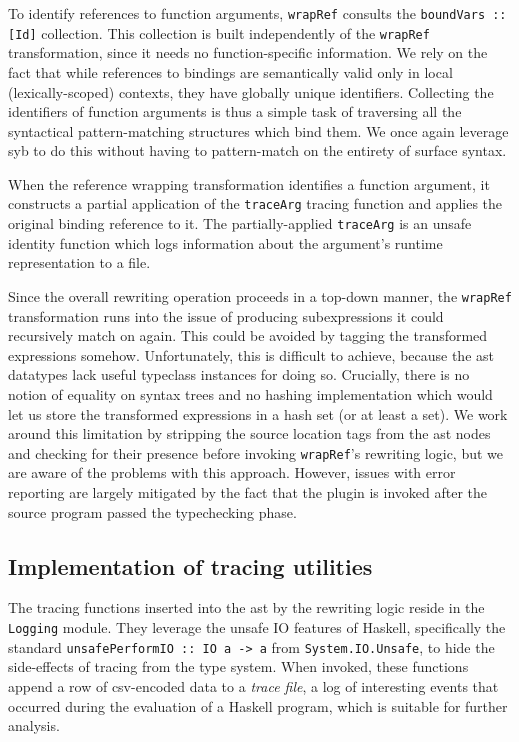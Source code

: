 \documentclass[thesis=B,english]{FITthesis}[2019/12/23]
\newcommand{\hsIdent}[1]{\texttt{#1}}
\newcommand{\hsModule}[1]{\texttt{#1}}
\newcommand{\hsCode}[1]{\texttt{#1}}
\begin{document}
\begin{description}
		To identify references to function arguments, \hsIdent{wrapRef}
		consults the \hsCode{boundVars :: [Id]} collection. This collection is
		built independently of the \hsIdent{wrapRef} transformation, since it
		needs no function-specific information. We rely on the fact that while
		references to bindings are semantically valid only in local
		(lexically-scoped) contexts, they have globally unique identifiers.
		Collecting the identifiers of function arguments is thus a simple task
		of traversing all the syntactical pattern-matching structures which
		bind them. We once again leverage \acrshort{syb} to do this without
		having to pattern-match on the entirety of surface syntax.

		When the reference wrapping transformation identifies a function
		argument, it constructs a partial application of the \hsIdent{traceArg}
		tracing function and applies the original binding reference to it. The
		partially-applied \hsIdent{traceArg} is an unsafe identity function
		which logs information about the argument's runtime representation to a
		file.

		Since the overall rewriting operation proceeds in a top-down manner,
		the \hsIdent{wrapRef} transformation runs into the issue of producing
		subexpressions it could recursively match on again. This could be
		avoided by tagging the transformed expressions somehow. Unfortunately,
		this is difficult to achieve, because the \acrshort{ast} datatypes lack
		useful typeclass instances for doing so. Crucially, there is no notion
		of equality on syntax trees and no hashing implementation which would
		let us store the transformed expressions in a hash set (or at least a
		set). We work around this limitation by stripping the source location
		tags from the \acrshort{ast} nodes and checking for their presence
		before invoking \hsIdent{wrapRef}'s rewriting logic, but we are aware
		of the problems with this approach. However, issues with error
		reporting are largely mitigated by the fact that the plugin is invoked
		after the source program passed the typechecking phase.
\end{description}

\subsection*{Implementation of tracing utilities} \label{sec:tracing-util-impl}
The tracing functions inserted into the \acrshort{ast} by the rewriting logic
reside in the \hsModule{Logging} module. They leverage the unsafe IO features
of Haskell, specifically the standard \hsCode{unsafePerformIO :: IO a -> a}
from \hsModule{System.IO.Unsafe}, to hide the side-effects of tracing from the
type system. When invoked, these functions append a row of
\acrshort{csv}-encoded data to a \textit{trace file}, a log of interesting
events that occurred during the evaluation of a Haskell program, which is
suitable for further analysis.
\end{document}
